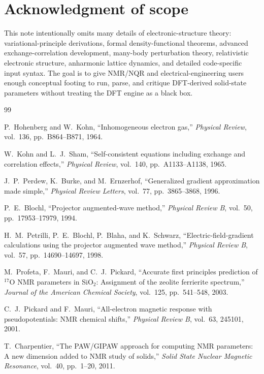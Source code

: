 \documentclass[11pt]{article}
\begin{document}
\section*{Acknowledgment of scope}

This note intentionally omits many details of electronic-structure theory: variational-principle derivations, formal density-functional theorems, advanced exchange-correlation development, many-body perturbation theory, relativistic electronic structure, anharmonic lattice dynamics, and detailed code-specific input syntax.  The goal is to give NMR/NQR and electrical-engineering users enough conceptual footing to run, parse, and critique DFT-derived solid-state parameters without treating the DFT engine as a black box.

\begin{thebibliography}{99}
\small

P.~Hohenberg and W.~Kohn, ``Inhomogeneous electron gas,'' \emph{Physical Review}, vol.~136, pp.~B864--B871, 1964.

W.~Kohn and L.~J.~Sham, ``Self-consistent equations including exchange and correlation effects,'' \emph{Physical Review}, vol.~140, pp.~A1133--A1138, 1965.

J.~P.~Perdew, K.~Burke, and M.~Ernzerhof, ``Generalized gradient approximation made simple,'' \emph{Physical Review Letters}, vol.~77, pp.~3865--3868, 1996.

P.~E.~Blochl, ``Projector augmented-wave method,'' \emph{Physical Review B}, vol.~50, pp.~17953--17979, 1994.

H.~M.~Petrilli, P.~E.~Blochl, P.~Blaha, and K.~Schwarz, ``Electric-field-gradient calculations using the projector augmented wave method,'' \emph{Physical Review B}, vol.~57, pp.~14690--14697, 1998.

M.~Profeta, F.~Mauri, and C.~J.~Pickard, ``Accurate first principles prediction of $^{17}$O NMR parameters in SiO$_2$: Assignment of the zeolite ferrierite spectrum,'' \emph{Journal of the American Chemical Society}, vol.~125, pp.~541--548, 2003.

C.~J.~Pickard and F.~Mauri, ``All-electron magnetic response with pseudopotentials: NMR chemical shifts,'' \emph{Physical Review B}, vol.~63, 245101, 2001.

T.~Charpentier, ``The PAW/GIPAW approach for computing NMR parameters: A new dimension added to NMR study of solids,'' \emph{Solid State Nuclear Magnetic Resonance}, vol.~40, pp.~1--20, 2011.


\end{thebibliography}
\end{document}
